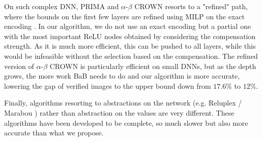 On such complex DNN, PRIMA and $\alpha$-$\beta$ CROWN resorts to a "refined" path, where the bounds on the first few layers are refined using MILP on the exact encoding \cite{MILP2}. In our algorithm, we do not use an exact encoding but a partial one with the most important
ReLU nodes obtained by considering the compensation strength. As it is much more efficient, 
this can be pushed to all layers, while this would be infeasible without the selection based on the compensation. The refined version of $\alpha$-$\beta$ CROWN is particularly efficient on small  DNNs, but as the depth grows, the more work BaB needs to do and our algorithm 
is more accurate, lowering the gap of verified images to the upper bound down from $17.6\%$ to $12\%$.

Finally, algorithms resorting to abstractions on the network (e.g. Reluplex / Marabou \cite{Reluplex,katz2019marabou}) rather than abstraction on the values are very different. These algorithms have been developed to be complete, so much slower but also more accurate than what we propose.
